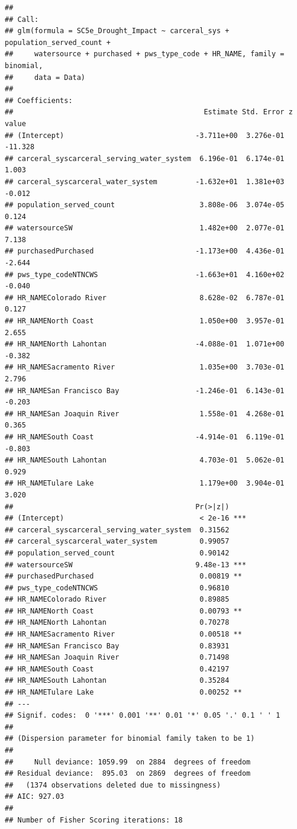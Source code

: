 \documentclass[
]{article}
\begin{document}
\begin{verbatim}
## 
## Call:
## glm(formula = SC5e_Drought_Impact ~ carceral_sys + population_served_count + 
##     watersource + purchased + pws_type_code + HR_NAME, family = binomial, 
##     data = Data)
## 
## Coefficients:
##                                             Estimate Std. Error z value
## (Intercept)                               -3.711e+00  3.276e-01 -11.328
## carceral_syscarceral_serving_water_system  6.196e-01  6.174e-01   1.003
## carceral_syscarceral_water_system         -1.632e+01  1.381e+03  -0.012
## population_served_count                    3.808e-06  3.074e-05   0.124
## watersourceSW                              1.482e+00  2.077e-01   7.138
## purchasedPurchased                        -1.173e+00  4.436e-01  -2.644
## pws_type_codeNTNCWS                       -1.663e+01  4.160e+02  -0.040
## HR_NAMEColorado River                      8.628e-02  6.787e-01   0.127
## HR_NAMENorth Coast                         1.050e+00  3.957e-01   2.655
## HR_NAMENorth Lahontan                     -4.088e-01  1.071e+00  -0.382
## HR_NAMESacramento River                    1.035e+00  3.703e-01   2.796
## HR_NAMESan Francisco Bay                  -1.246e-01  6.143e-01  -0.203
## HR_NAMESan Joaquin River                   1.558e-01  4.268e-01   0.365
## HR_NAMESouth Coast                        -4.914e-01  6.119e-01  -0.803
## HR_NAMESouth Lahontan                      4.703e-01  5.062e-01   0.929
## HR_NAMETulare Lake                         1.179e+00  3.904e-01   3.020
##                                           Pr(>|z|)    
## (Intercept)                                < 2e-16 ***
## carceral_syscarceral_serving_water_system  0.31562    
## carceral_syscarceral_water_system          0.99057    
## population_served_count                    0.90142    
## watersourceSW                             9.48e-13 ***
## purchasedPurchased                         0.00819 ** 
## pws_type_codeNTNCWS                        0.96810    
## HR_NAMEColorado River                      0.89885    
## HR_NAMENorth Coast                         0.00793 ** 
## HR_NAMENorth Lahontan                      0.70278    
## HR_NAMESacramento River                    0.00518 ** 
## HR_NAMESan Francisco Bay                   0.83931    
## HR_NAMESan Joaquin River                   0.71498    
## HR_NAMESouth Coast                         0.42197    
## HR_NAMESouth Lahontan                      0.35284    
## HR_NAMETulare Lake                         0.00252 ** 
## ---
## Signif. codes:  0 '***' 0.001 '**' 0.01 '*' 0.05 '.' 0.1 ' ' 1
## 
## (Dispersion parameter for binomial family taken to be 1)
## 
##     Null deviance: 1059.99  on 2884  degrees of freedom
## Residual deviance:  895.03  on 2869  degrees of freedom
##   (1374 observations deleted due to missingness)
## AIC: 927.03
## 
## Number of Fisher Scoring iterations: 18
\end{verbatim}
\end{document}
